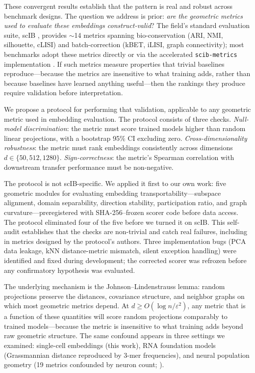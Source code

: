 \documentclass[10pt,letterpaper]{article}
\begin{document}
These convergent results establish that the pattern is real and robust across benchmark designs. The question we address is prior: \emph{are the geometric metrics used to evaluate these embeddings construct-valid}? The field's standard evaluation suite, scIB \citep{luecken2022scib}, provides $\sim$14 metrics spanning bio-conservation (ARI, NMI, silhouette, cLISI) and batch-correction (kBET, iLISI, graph connectivity); most benchmarks adopt these metrics directly or via the accelerated \texttt{scib-metrics} implementation \citep{scibmetrics2023}. If such metrics measure properties that trivial baselines reproduce---because the metrics are insensitive to what training adds, rather than because baselines have learned anything useful---then the rankings they produce require validation before interpretation.

We propose a protocol for performing that validation, applicable to any geometric metric used in embedding evaluation. The protocol consists of three checks. \emph{Null-model discrimination}: the metric must score trained models higher than random linear projections, with a bootstrap 95\% CI excluding zero. \emph{Cross-dimensionality robustness}: the metric must rank embeddings consistently across dimensions $d \in \{50, 512, 1280\}$. \emph{Sign-correctness}: the metric's Spearman correlation with downstream transfer performance must be non-negative.

The protocol is not scIB-specific. We applied it first to our own work: five geometric modules for evaluating embedding transportability---subspace alignment, domain separability, direction stability, participation ratio, and graph curvature---preregistered with SHA-256--frozen scorer code before data access. The protocol eliminated four of the five before we turned it on scIB. This self-audit establishes that the checks are non-trivial and catch real failures, including in metrics designed by the protocol's authors. Three implementation bugs (PCA data leakage, kNN distance-metric mismatch, silent exception handling) were identified and fixed during development; the corrected scorer was refrozen before any confirmatory hypothesis was evaluated.

The underlying mechanism is the Johnson--Lindenstrauss lemma: random projections preserve the distances, covariance structure, and neighbor graphs on which most geometric metrics depend. At $d \geq O(\log n / \varepsilon^2)$, any metric that is a function of these quantities will score random projections comparably to trained models---because the metric is insensitive to what training adds beyond raw geometric structure. The same confound appears in three settings we examined: single-cell embeddings (this work), RNA foundation models (Grassmannian distance reproduced by 3-mer frequencies), and neural population geometry (19 metrics confounded by neuron count; \citealp{tower2026bracket}).
\end{document}
